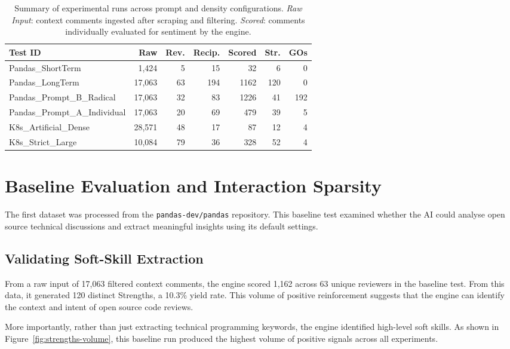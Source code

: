 \documentclass[a4paper,UKenglish,cleveref,autoref]{lipics-v2021}
\begin{document}
\begin{table}[!tbp]
\centering
\caption{Summary of experimental runs across prompt and density configurations. \textit{Raw Input}: context comments ingested after scraping and filtering. \textit{Scored}: comments individually evaluated for sentiment by the engine.}
\label{tab:experiments}
\small
\begin{tabular}{@{}lrrrrrr@{}}
\toprule
\textbf{Test ID} & \textbf{Raw} & \textbf{Rev.} & \textbf{Recip.} & \textbf{Scored} & \textbf{Str.} & \textbf{GOs} \\
\midrule
Pandas\_ShortTerm              &  1{,}424 &  5 &  15 &   32 &   6 &   0 \\
Pandas\_LongTerm               & 17{,}063 & 63 & 194 & 1162 & 120 &   0 \\
Pandas\_Prompt\_B\_Radical     & 17{,}063 & 32 &  83 & 1226 &  41 & 192 \\
Pandas\_Prompt\_A\_Individual  & 17{,}063 & 20 &  69 &  479 &  39 &   5 \\
K8s\_Artificial\_Dense         & 28{,}571 & 48 &  17 &   87 &  12 &   4 \\
K8s\_Strict\_Large             & 10{,}084 & 79 &  36 &  328 &  52 &   4 \\
\bottomrule
\end{tabular}
\end{table}

\section{Baseline Evaluation and Interaction Sparsity}
The first dataset was processed from the \texttt{pandas-dev/pandas} repository. This baseline test examined whether the AI could analyse open source technical discussions and extract meaningful insights using its default settings.

\subsection{Validating Soft-Skill Extraction}
From a raw input of 17,063 filtered context comments, the engine scored 1,162 across 63 unique reviewers in the baseline test. From this data, it generated 120 distinct Strengths, a 10.3\% yield rate. This volume of positive reinforcement suggests that the engine can identify the context and intent of open source code reviews.

More importantly, rather than just extracting technical programming keywords, the engine identified high-level soft skills. As shown in Figure~\ref{fig:strengths-volume}, this baseline run produced the highest volume of positive signals across all experiments.
\end{document}
